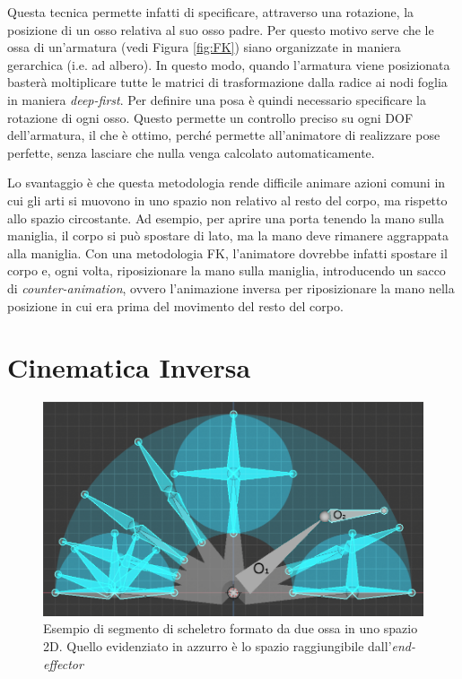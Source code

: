Questa tecnica permette infatti di specificare, attraverso una rotazione, la posizione di un osso relativa al suo osso padre. Per questo motivo serve che le ossa di un'armatura (vedi Figura \ref{fig:FK}) siano organizzate in maniera gerarchica (i.e. ad albero). In questo modo, quando l'armatura viene posizionata basterà moltiplicare tutte le matrici di trasformazione dalla radice ai nodi foglia in maniera \emph{deep-first}. 
Per definire una posa è quindi necessario specificare la rotazione di ogni osso. Questo permette un controllo preciso su ogni DOF dell'armatura, il che è ottimo, perché permette all'animatore di realizzare pose perfette, senza lasciare che nulla venga calcolato automaticamente. 

Lo svantaggio è che questa metodologia rende difficile animare azioni comuni in cui gli arti si muovono in uno spazio non relativo al resto del corpo, ma rispetto allo spazio circostante. Ad esempio, per aprire una porta tenendo la mano sulla maniglia, il corpo si può spostare di lato, ma la mano deve rimanere aggrappata alla maniglia. Con una metodologia FK, l'animatore dovrebbe infatti spostare il corpo e, ogni volta, riposizionare la mano sulla maniglia, introducendo un sacco di \emph{counter-animation}, ovvero l'animazione inversa per riposizionare la mano nella posizione in cui era prima del movimento del resto del corpo.

\section{Cinematica Inversa} \label{sectionIK}

\begin{figure}
\centering
\includegraphics[width=.8\textwidth]{Figures/2Dlinkage}
\decoRule
\caption[Inverse Kinematic 2D]{Esempio di segmento di scheletro formato da due ossa in uno spazio 2D. Quello evidenziato in azzurro è lo spazio raggiungibile dall'\emph{end-effector}}
\label{fig:IK}
\end{figure}

